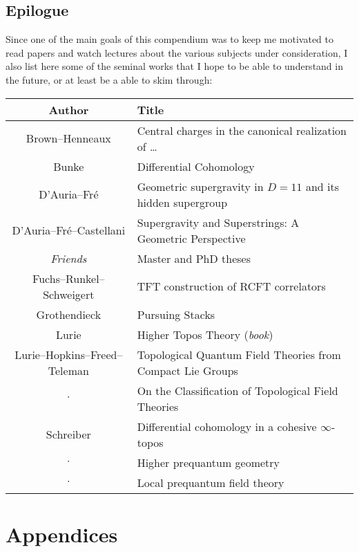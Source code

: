 \documentclass[12pt, a4paper]{report}
\begin{document}
\chapter{Epilogue}

   Since one of the main goals of this compendium was to keep me motivated to read papers and watch lectures about the various subjects under consideration, I also list here some of the seminal works that I hope to be able to understand in the future, or at least be a able to skim through:

   \begin{center}
       \begin{tabular}{|c|l|}
           \hline
           Author&Title\\
           \hline
           Brown--Henneaux&Central charges in the canonical realization of \ldots\\
			Bunke&Differential Cohomology\\
			D'Auria--Fr\'e&Geometric supergravity in $D=11$ and its hidden supergroup\\
			D'Auria--Fr\'e--Castellani&Supergravity and Superstrings: A Geometric Perspective\\
           \textit{Friends}&Master and PhD theses\\
           Fuchs--Runkel--Schweigert&TFT construction of RCFT correlators\\
           Grothendieck&Pursuing Stacks\\
           Lurie&Higher Topos Theory (\textit{book})\\
           Lurie--Hopkins--Freed--Teleman&Topological Quantum Field Theories from Compact Lie Groups\\
           $\cdot$&On the Classification of Topological Field Theories\\
           Schreiber&Differential cohomology in a cohesive $\infty$-topos\\
           $\cdot$&Higher prequantum geometry\\
           $\cdot$&Local prequantum field theory\\
           \hline
       \end{tabular}
   \end{center}

\part{Appendices}
\begin{appendices}


\end{appendices}
\end{document}
